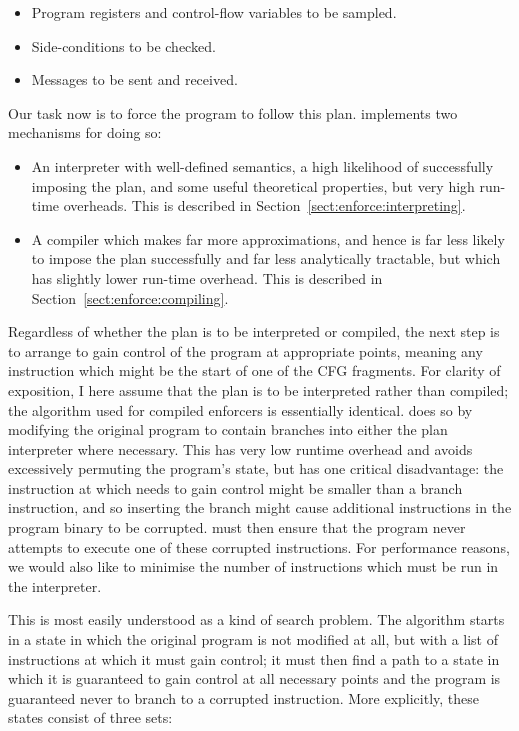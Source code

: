 \begin{itemize}
\item Program registers and control-flow variables to be sampled.
\item Side-conditions to be checked.
\item Messages to be sent and received.
\end{itemize}

Our task now is to force the program to follow this plan.
{\Implementation} implements two mechanisms for doing so:

\begin{itemize}
\item
  An interpreter with well-defined semantics, a high likelihood of
  successfully imposing the plan, and some useful theoretical
  properties, but very high run-time overheads.  This is described in
  Section~\ref{sect:enforce:interpreting}.
\item
  A compiler which makes far more approximations, and hence is far
  less likely to impose the plan successfully and far less
  analytically tractable, but which has slightly lower run-time
  overhead.  This is described in Section~\ref{sect:enforce:compiling}.
\end{itemize}

\label{sect:enforce:assign_entry_points}
Regardless of whether the plan is to be interpreted or compiled, the
next step is to arrange to gain control of the program at appropriate
points, meaning any instruction which might be the start of one of the
CFG fragments.  For clarity of exposition, I here assume that the plan
is to be interpreted rather than compiled; the algorithm used for
compiled enforcers is essentially identical. {\Implementation} does so
by modifying the original program to contain branches into either the
plan interpreter where necessary.  This has very low runtime overhead
and avoids excessively permuting the program's state, but has one
critical disadvantage: the instruction at which {\implementation}
needs to gain control might be smaller than a branch instruction, and
so inserting the branch might cause additional instructions in the
program binary to be corrupted.  {\Implementation} must then ensure
that the program never attempts to execute one of these corrupted
instructions.  For performance reasons, we would also like to minimise
the number of instructions which must be run in the interpreter.

This is most easily understood as a kind of search problem.  The
algorithm starts in a state in which the original program is not
modified at all, but with a list of instructions at which it must gain
control; it must then find a path to a state in which it is guaranteed
to gain control at all necessary points and the program is guaranteed
never to branch to a corrupted instruction.  More explicitly, these
states consist of three sets:

